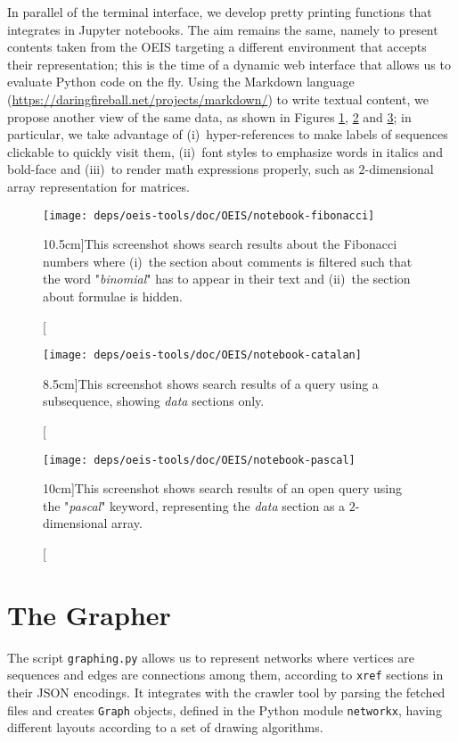 In parallel of the terminal interface, we develop pretty printing functions
that integrates in Jupyter notebooks. The aim remains the same, namely to
present contents taken from the OEIS targeting a different environment that
accepts their representation; this is the time of a dynamic web interface that
allows us to evaluate Python code on the fly. Using the Markdown language
(\url{https://daringfireball.net/projects/markdown/}) to write textual content,
we propose another view of the same data, as shown in Figures
\ref{fig:oeis:notebook:fibonacci}, \ref{fig:oeis:notebook:catalan} and
\ref{fig:oeis:notebook:pascal}; in particular, we take advantage of
(i)~hyper-references to make labels of sequences clickable to quickly visit
them, (ii)~font styles to emphasize words in italics and bold-face and (iii)~to
render math expressions properly, such as $2$-dimensional array representation
for matrices.

\begin{figure}
\texttt{[image: deps/oeis-tools/doc/OEIS/notebook-fibonacci]}
\caption[][10.5cm]{This screenshot shows search results about the Fibonacci numbers where
(i)~the section about comments is filtered such that the word "\emph{binomial}"
has to appear in their text and (ii)~the section about formulae is hidden.}
\label{fig:oeis:notebook:fibonacci}
\end{figure}

\begin{figure}
\texttt{[image: deps/oeis-tools/doc/OEIS/notebook-catalan]}
\caption[][8.5cm]{This screenshot shows search results of a query using a subsequence,
showing \emph{data} sections only.}
\label{fig:oeis:notebook:catalan}
\end{figure}

\begin{figure}
\texttt{[image: deps/oeis-tools/doc/OEIS/notebook-pascal]}
\caption[][10cm]{This screenshot shows search results of an open query using the
"\emph{pascal}" keyword, representing the \emph{data} section as a
$2$-dimensional array.  }
\label{fig:oeis:notebook:pascal}
\end{figure}

\section{The Grapher}

The script \verb|graphing.py| allows us to represent networks where vertices
are sequences and edges are connections among them, according to \verb|xref|
sections in their JSON encodings. It integrates with the crawler tool by
parsing the fetched files and creates \verb|Graph| objects, defined in the
Python module \verb|networkx|, having different layouts according to a set of
drawing algorithms.

